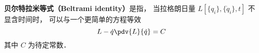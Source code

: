

\textbf{贝尔特拉米等式（Beltrami identity）}是指， 当拉格朗日量 $L[\{q_i\}, \{\dot q_i\}, t]$ 不显含时间时， 可以与一个更简单的方程等效
\begin{equation}
L - \dot q \pdv{L}{\dot q} = C
\end{equation}
其中 $C$ 为待定常数．
